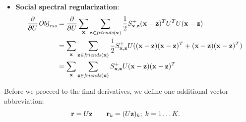 \begin{itemize}
\item {\bf Social spectral regularization}:
\begin{align*}
\frac{\partial}{\partial U} \mathit{Obj}_{\mathit{rss}} & = \frac{\partial}{\partial U} \sum_{\mathbf{x}} \sum_{\mathbf{z} \in \mathit{friends}(\mathbf{x})} \frac{1}{2} S^+_{\mathbf{x},\mathbf{z}} (\mathbf{x} - \mathbf{z})^T U^T U (\mathbf{x} - \mathbf{z}) \\
& = \sum_{\mathbf{x}} \sum_{\mathbf{z} \in \mathit{friends}(\mathbf{x})} \frac{1}{2} S^+_{\mathbf{x},\mathbf{z}} U ((\mathbf{x} - \mathbf{z})(\mathbf{x} - \mathbf{z})^T + (\mathbf{x} - \mathbf{z})(\mathbf{x} - \mathbf{z})^T)\\
& = \sum_{\mathbf{x}} \sum_{\mathbf{z} \in \mathit{friends}(\mathbf{x})} S^+_{\mathbf{x},\mathbf{z}} U (\mathbf{x} - \mathbf{z})(\mathbf{x} - \mathbf{z})^T
\end{align*}
\end{itemize}
Before we proceed to the final derivatives, we define one additional
vector abbreviation: 
\begin{align*}
\mathbf{r} & = U \mathbf{z} \qquad \mathbf{r}_{k} = (U \mathbf{z})_{k}; \; k=1\ldots K .
\end{align*}
